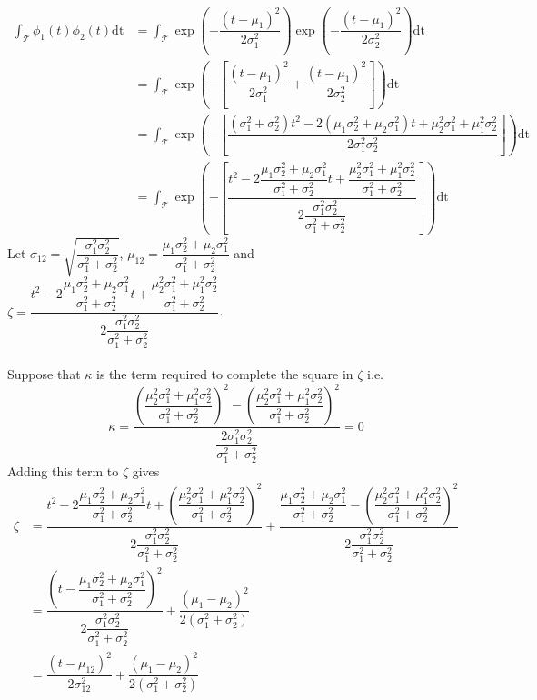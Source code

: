 \begin{align}
\int_{\mathcal{T}} \phi_1(t) \phi_2(t)\mathrm{dt} &= \int_{\mathcal{T}} \exp \left(-\dfrac{\left(t-\mu_1\right)^2}{2\sigma^2_1}\right) \exp \left(-\dfrac{\left(t-\mu_1\right)^2}{2\sigma^2_2}\right)\mathrm{dt} \nonumber \\
&= \int_{\mathcal{T}} \exp \left(- \left[\dfrac{\left(t-\mu_1\right)^2}{2\sigma^2_1} + \dfrac{\left(t-\mu_1\right)^2}{2\sigma^2_2}\right]\right)\mathrm{dt} \nonumber \\
&= \int_{\mathcal{T}} \exp \left(- \left[\dfrac{\left(\sigma^2_1+\sigma^2_2\right) t^2 -2\left(\mu_1\sigma^2_2+\mu_2\sigma^2_1\right)t+\mu^2_2\sigma^2_1+\mu^2_1\sigma^2_2}{2\sigma^2_1\sigma^2_2}\right]\right)\mathrm{dt} \nonumber \\
&= \int_{\mathcal{T}} \exp \left(- \left[\dfrac{t^2 -2\dfrac{\mu_1\sigma^2_2+\mu_2\sigma^2_1}{\sigma^2_1+\sigma^2_2}t+\dfrac{\mu^2_2\sigma^2_1+\mu^2_1\sigma^2_2}{\sigma^2_1+\sigma^2_2}}{2\dfrac{\sigma^2_1\sigma^2_2}{\sigma^2_1+\sigma^2_2}}\right]\right)\mathrm{dt} \nonumber
\end{align}
Let $\sigma_{12} = \sqrt{\dfrac{\sigma^2_1\sigma^2_2}{\sigma^2_1+\sigma^2_2}}$, $\mu_{12} = \dfrac{\mu_1\sigma^2_2+\mu_2\sigma^2_1}{\sigma^2_1+\sigma^2_2}$  and $\zeta = \dfrac{t^2 -2\dfrac{\mu_1\sigma^2_2+\mu_2\sigma^2_1}{\sigma^2_1+\sigma^2_2}t+\dfrac{\mu^2_2\sigma^2_1+\mu^2_1\sigma^2_2}{\sigma^2_1+\sigma^2_2}}{2\dfrac{\sigma^2_1\sigma^2_2}{\sigma^2_1+\sigma^2_2}}$.\\
\\
Suppose that $\kappa$ is the term required to complete the square in $\zeta$ i.e.
\begin{equation*}
\kappa = \dfrac{\left(\dfrac{\mu^2_2\sigma^2_1+\mu^2_1\sigma^2_2}{\sigma^2_1+\sigma^2_2}\right)^2 - \left(\dfrac{\mu^2_2\sigma^2_1+\mu^2_1\sigma^2_2}{\sigma^2_1+\sigma^2_2}\right)^2}{\dfrac{2\sigma^2_1\sigma^2_2}{\sigma^2_1+\sigma^2_2}} = 0
\end{equation*}
Adding this term to $\zeta$ gives
\begin{align}
\zeta &= \dfrac{t^2 -2\dfrac{\mu_1\sigma^2_2+\mu_2\sigma^2_1}{\sigma^2_1+\sigma^2_2}t+\left(\dfrac{\mu^2_2\sigma^2_1+\mu^2_1\sigma^2_2}{\sigma^2_1+\sigma^2_2}\right)^2}{2\dfrac{\sigma^2_1\sigma^2_2}{\sigma^2_1+\sigma^2_2}}+\dfrac{\dfrac{\mu_1\sigma^2_2+\mu_2\sigma^2_1}{\sigma^2_1+\sigma^2_2}-\left(\dfrac{\mu^2_2\sigma^2_1+\mu^2_1\sigma^2_2}{\sigma^2_1+\sigma^2_2}\right)^2}{2\dfrac{\sigma^2_1\sigma^2_2}{\sigma^2_1+\sigma^2_2}} \nonumber \\
&= \dfrac{\left(t-\dfrac{\mu_1\sigma^2_2+\mu_2\sigma^2_1}{\sigma^2_1+\sigma^2_2}\right)^2}{2\dfrac{\sigma^2_1\sigma^2_2}{\sigma^2_1+\sigma^2_2}} + \dfrac{\left(\mu_1-\mu_2\right)^2}{2\left(\sigma_1^2+\sigma^2_2\right)} \nonumber \\
&= \dfrac{\left(t-\mu_{12}\right)^2}{2\sigma^2_{12}}+\dfrac{\left(\mu_1-\mu_2\right)^2}{2\left(\sigma_1^2+\sigma^2_2\right)}
\end{align}
